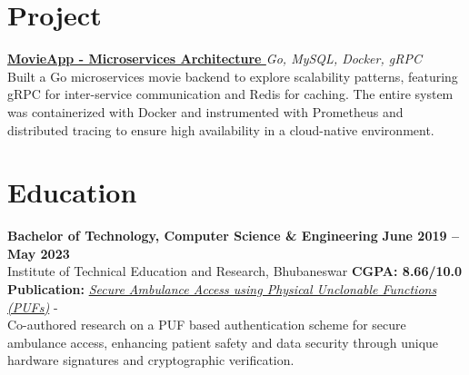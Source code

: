 \documentclass[a4paper,12pt]{article}
\newenvironment{project}[2]
  {
    \noindent\textbf{#1} \hfill \textit{#2}\\[2pt] %
  }
  {}
\begin{document}
\section{Project}
\begin{project}
    {\href{https://github.com/abhishek622/movieapp}{MovieApp - Microservices Architecture \raisebox{-0.05\height}\faGithub}}
    {Go, MySQL, Docker, gRPC}
    Built a Go microservices movie backend to explore scalability patterns, featuring gRPC for inter-service communication and Redis for caching. The entire system was containerized with Docker and instrumented with Prometheus and distributed tracing to ensure high availability in a cloud-native environment.
\end{project}

\section{Education}
\textbf{Bachelor of Technology, Computer Science \& Engineering} \hfill \textbf{June 2019 -- May 2023} \\
Institute of Technical Education and Research, Bhubaneswar \hfill \textbf{CGPA: 8.66/10.0} \\
\textbf{Publication:} \href{https://ieeexplore.ieee.org/abstract/document/11063984}{\textit{Secure Ambulance Access using Physical Unclonable Functions (PUFs)}} - \\Co-authored research on a PUF based authentication scheme for secure ambulance access, enhancing patient safety and data security through unique hardware signatures and cryptographic verification.
\end{document}
